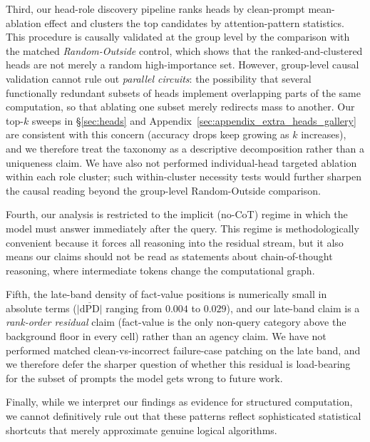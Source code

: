 \documentclass[11pt]{article}
\begin{document}
Third, our head-role discovery pipeline ranks heads by clean-prompt mean-ablation effect and clusters the top candidates by attention-pattern statistics. This procedure is causally validated at the group level by the comparison with the matched \textit{Random-Outside} control, which shows that the ranked-and-clustered heads are not merely a random high-importance set. However, group-level causal validation cannot rule out \textit{parallel circuits}: the possibility that several functionally redundant subsets of heads implement overlapping parts of the same computation, so that ablating one subset merely redirects mass to another. Our top-$k$ sweeps in §\ref{sec:heads} and Appendix~\ref{sec:appendix_extra_heads_gallery} are consistent with this concern (accuracy drops keep growing as $k$ increases), and we therefore treat the taxonomy as a descriptive decomposition rather than a uniqueness claim. We have also not performed individual-head targeted ablation within each role cluster; such within-cluster necessity tests would further sharpen the causal reading beyond the group-level Random-Outside comparison.

Fourth, our analysis is restricted to the implicit (no-CoT) regime in which the model must answer immediately after the query. This regime is methodologically convenient because it forces all reasoning into the residual stream, but it also means our claims should not be read as statements about chain-of-thought reasoning, where intermediate tokens change the computational graph.

Fifth, the late-band density of fact-value positions is numerically small in absolute terms ($\overline{|\mathrm{dPD}|}$ ranging from $0.004$ to $0.029$), and our late-band claim is a \textit{rank-order residual} claim (fact-value is the only non-query category above the background floor in every cell) rather than an agency claim. We have not performed matched clean-vs-incorrect failure-case patching on the late band, and we therefore defer the sharper question of whether this residual is load-bearing for the subset of prompts the model gets wrong to future work.

Finally, while we interpret our findings as evidence for structured computation, we cannot definitively rule out that these patterns reflect sophisticated statistical shortcuts that merely approximate genuine logical algorithms.



%

\end{document}
